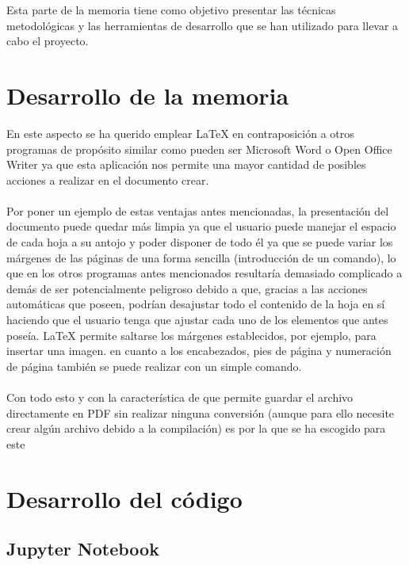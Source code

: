 
Esta parte de la memoria tiene como objetivo presentar las técnicas metodológicas y las herramientas de desarrollo que se han utilizado para llevar a cabo el proyecto.\\

\section{Desarrollo de la memoria}

En este aspecto se ha querido emplear LaTeX \cite{wiki:latex} en contraposición a otros programas de propósito similar como pueden ser Microsoft Word o Open Office Writer ya que esta aplicación nos permite una mayor cantidad de posibles acciones a realizar en el documento crear. \\
\\
Por poner un ejemplo de estas ventajas antes mencionadas, la presentación del documento puede quedar más limpia ya que el usuario puede manejar el espacio de cada hoja a su antojo y poder disponer de todo él ya que se puede variar los márgenes de las páginas de una forma sencilla (introducción de un comando), lo que en los otros programas antes mencionados resultaría demasiado complicado a demás de ser potencialmente peligroso debido a que, gracias a las acciones automáticas que poseen, podrían desajustar todo el contenido de la hoja en sí haciendo que el usuario tenga que ajustar cada uno de los elementos que antes poseía. LaTeX permite saltarse los márgenes establecidos, por ejemplo, para insertar una imagen. en cuanto a los encabezados, pies de página y numeración de página también se puede realizar con un simple comando. \\
\\
Con todo esto y con la característica de que permite guardar el archivo directamente en PDF sin realizar ninguna conversión (aunque para ello necesite crear algún archivo debido a la compilación) es por la que se ha escogido para este 

\section{Desarrollo del código}

\subsection{Jupyter Notebook}

